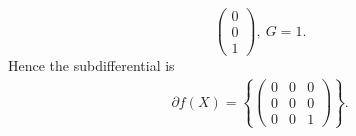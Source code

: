\begin{exercise}
\begin{enumerate}
\begin{solution}
\begin{enumerate}
\begin{enumerate}
$$\begin{pmatrix}
                    0 \\
                    0 \\  
                    1
                  \end{pmatrix},\ G = 1.
                $$
                Hence the subdifferential is
                \begin{align*}
                  \partial f(X) = \left\{
                  \begin{pmatrix}
                    0 & 0 & 0  \\
                    0 & 0 & 0  \\
                    0 & 0 & 1
                  \end{pmatrix}\right\}.
                  \tag*{\qedhere}
                \end{align*}
            \end{enumerate}
        \end{enumerate}
      \end{solution}
      
      
  \end{enumerate}
\end{exercise}
\newpage







